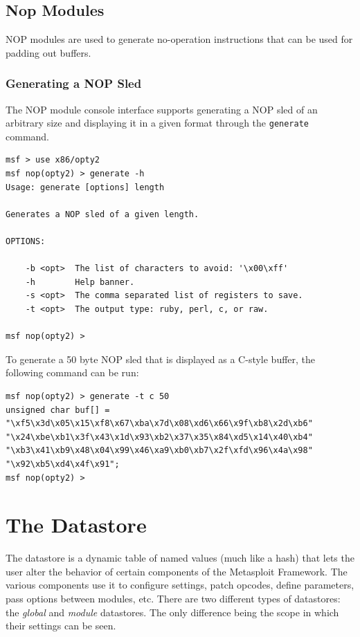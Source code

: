 \documentclass{report}
\begin{document}
	\section{Nop Modules}

\par
NOP modules are used to generate no-operation instructions that can be used for
padding out buffers.

		\subsection{Generating a NOP Sled}

\par
The NOP module console interface supports generating a NOP sled of an arbitrary
size and displaying it in a given format through the \texttt{generate} command.

\begin{verbatim}
msf > use x86/opty2
msf nop(opty2) > generate -h
Usage: generate [options] length

Generates a NOP sled of a given length.

OPTIONS:

    -b <opt>  The list of characters to avoid: '\x00\xff'
    -h        Help banner.
    -s <opt>  The comma separated list of registers to save.
    -t <opt>  The output type: ruby, perl, c, or raw.

msf nop(opty2) >
\end{verbatim}

\par
To generate a 50 byte NOP sled that is displayed as a C-style buffer, the
following command can be run:

\begin{verbatim}
msf nop(opty2) > generate -t c 50
unsigned char buf[] =
"\xf5\x3d\x05\x15\xf8\x67\xba\x7d\x08\xd6\x66\x9f\xb8\x2d\xb6"
"\x24\xbe\xb1\x3f\x43\x1d\x93\xb2\x37\x35\x84\xd5\x14\x40\xb4"
"\xb3\x41\xb9\x48\x04\x99\x46\xa9\xb0\xb7\x2f\xfd\x96\x4a\x98"
"\x92\xb5\xd4\x4f\x91";
msf nop(opty2) >
\end{verbatim}

\pagebreak

\chapter{The Datastore}

\par
The datastore is a dynamic table of named values (much like a hash) that lets
the user alter the behavior of certain components of the Metasploit Framework.
The various components use it to configure settings, patch opcodes, define
parameters, pass options between modules, etc. There are two different types of
datastores: the \textit{global} and \textit{module} datastores. The only
difference being the scope in which their settings can be seen.
\end{document}

